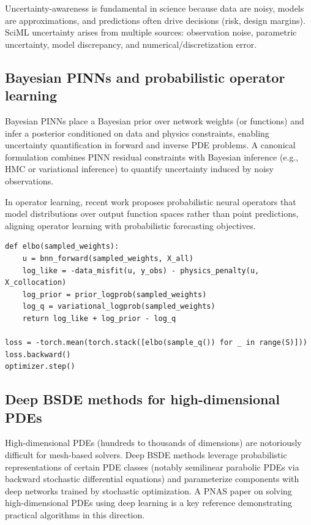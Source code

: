 \documentclass[11pt]{article}
\begin{document}
Uncertainty-awareness is fundamental in science because data are noisy, models are approximations, and predictions often drive decisions (risk, design margins). SciML uncertainty arises from multiple sources: observation noise, parametric uncertainty, model discrepancy, and numerical/discretization error.

\subsection{Bayesian PINNs and probabilistic operator learning}

Bayesian PINNs place a Bayesian prior over network weights (or functions) and infer a posterior conditioned on data and physics constraints, enabling uncertainty quantification in forward and inverse PDE problems. A canonical formulation combines PINN residual constraints with Bayesian inference (e.g., HMC or variational inference) to quantify uncertainty induced by noisy observations.

In operator learning, recent work proposes probabilistic neural operators that model distributions over output function spaces rather than point predictions, aligning operator learning with probabilistic forecasting objectives.

\begin{lstlisting}[style=scimlpython,caption={Representative Bayesian PINN objective with variational parameters.},label={lst:bayespinn}]
def elbo(sampled_weights):
    u = bnn_forward(sampled_weights, X_all)
    log_like = -data_misfit(u, y_obs) - physics_penalty(u, X_collocation)
    log_prior = prior_logprob(sampled_weights)
    log_q = variational_logprob(sampled_weights)
    return log_like + log_prior - log_q

loss = -torch.mean(torch.stack([elbo(sample_q()) for _ in range(S)]))
loss.backward()
optimizer.step()
\end{lstlisting}

\subsection{Deep BSDE methods for high-dimensional PDEs}

High-dimensional PDEs (hundreds to thousands of dimensions) are notoriously difficult for mesh-based solvers. Deep BSDE methods leverage probabilistic representations of certain PDE classes (notably semilinear parabolic PDEs via backward stochastic differential equations) and parameterize components with deep networks trained by stochastic optimization. A PNAS paper on solving high-dimensional PDEs using deep learning is a key reference demonstrating practical algorithms in this direction.
\end{document}
